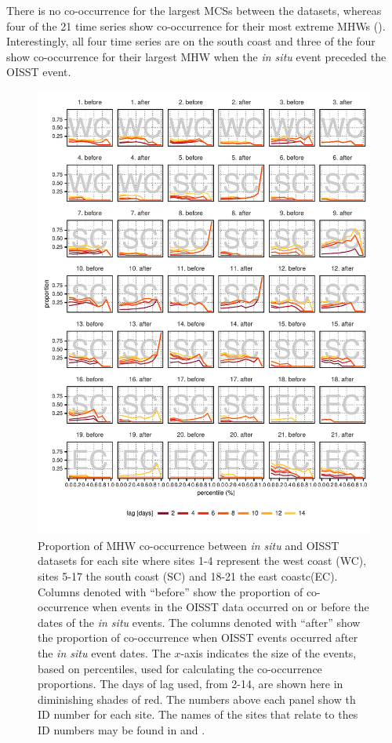 \documentclass[a4paper,10pt,review]{elsarticle}
\begin{document}
There is no co-occurrence for the largest MCSs between the datasets, whereas four of the 21 time series show co-occurrence for their most extreme MHWs (). Interestingly, all four time series are on the south coast and three of the four show co-occurrence for their largest MHW when the \emph{in situ} event preceded the OISST event.

\begin{figure}
\includegraphics[width=1.0\textwidth]{figure4.pdf}
\caption{Proportion of MHW co-occurrence between \emph{in situ} and OISST datasets for each site where sites 1-4 represent the west coast (WC), sites 5-17 the south coast (SC) and 18-21 the east coastc(EC). Columns denoted with ``before'' show the proportion of co-occurrence when events in the OISST data occurred on or before the dates of the \emph{in situ} events. The columns denoted with ``after'' show the proportion of co-occurrence when OISST events occurred after the \emph{in situ} event dates. The $x$-axis indicates the size of the events, based on percentiles, used for calculating the co-occurrence proportions. The days of lag used, from 2-14, are shown here in diminishing shades of red. The numbers above each panel show th ID number for each site. The names of the sites that relate to thes ID numbers may be found in  and .}
\label{fig:Figure4}
\end{figure}
\end{document}
